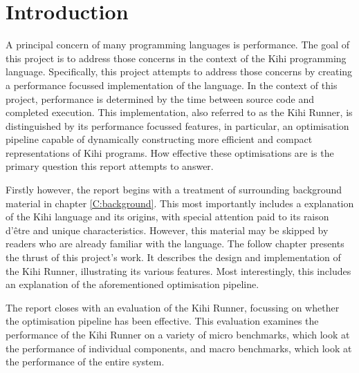 \chapter{Introduction} \label{C:intro}
A principal concern of many programming languages is performance. The goal of this project is to address those concerns in the context of the Kihi programming language. Specifically, this project attempts to address those concerns by creating a performance focussed implementation of the language. In the context of this project, performance is determined by the time between source code and completed execution. This implementation, also referred to as the Kihi Runner, is distinguished by its performance focussed features, in particular, an optimisation pipeline capable of dynamically constructing more efficient and compact representations of Kihi programs. How effective these optimisations are is the primary question this report attempts to answer.


Firstly however, the report begins with a treatment of surrounding background material in chapter \ref{C:background}. This most importantly includes a explanation of the Kihi language and its origins, with special attention paid to its raison d'être and unique characteristics. However, this material may be skipped by readers who are already familiar with the language. The follow chapter presents the thrust of this project's work. It describes the design and implementation of the Kihi Runner, illustrating its various features. Most interestingly, this includes an explanation of the aforementioned optimisation pipeline. 

The report closes with an evaluation of the Kihi Runner, focussing on whether the optimisation pipeline has been effective. This evaluation examines the performance of the Kihi Runner on a variety of micro benchmarks, which look at the performance of individual components, and macro benchmarks, which look at the performance of the entire system.
